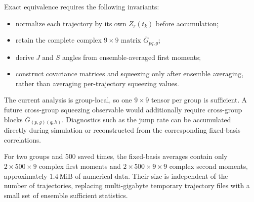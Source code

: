 \documentclass[11pt]{article}
\begin{document}
Exact equivalence requires the following invariants:
\begin{itemize}
  \item normalize each trajectory by its own $Z_r(t_k)$ before accumulation;
  \item retain the complete complex $9\times9$ matrix
  $\overline{G}_{pq,g}$;
  \item derive $J$ and $S$ angles from ensemble-averaged first moments;
  \item construct covariance matrices and squeezing only after ensemble
  averaging, rather than averaging per-trajectory squeezing values.
\end{itemize}

The current analysis is group-local, so one $9\times9$ tensor per group is
sufficient.  A future cross-group squeezing observable would additionally
require cross-group blocks
$\overline{G}_{(p,g)(q,h)}$.  Diagnostics such as the jump rate can be
accumulated directly during simulation or reconstructed from the corresponding
fixed-basis correlations.

For two groups and 500 saved times, the fixed-basis averages contain only
$2\times500\times9$ complex first moments and
$2\times500\times9\times9$ complex second moments, approximately
$1.4\,\mathrm{MiB}$ of numerical data.  Their size is independent of the
number of trajectories, replacing multi-gigabyte temporary trajectory files
with a small set of ensemble sufficient statistics.
\end{document}
